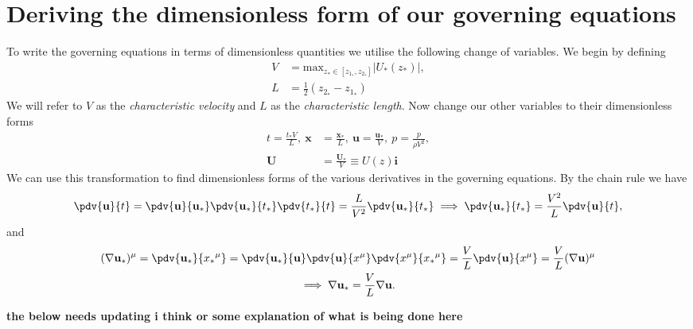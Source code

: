 \section{Deriving the dimensionless form of our governing equations}
To write the governing equations in terms of dimensionless quantities we utilise the following change of variables. We begin by defining
\begin{align}
    V &= \text{max}_{z_* \in [z_{1_*}, z_{2_*}]} |U_* (z_*)|, \nonumber\\
    L &= \frac{1}{2}(z_{2_*} - z_{1_*})
\end{align}
We will refer to $ V $ as the \emph{characteristic velocity} and $ L $ as the \emph{characteristic length}. Now change our other variables to their dimensionless forms
\begin{align}
    t = \frac{t_* V}{L},\ \mathbf{x} &= \frac{\mathbf{x_*}}{L},\ \mathbf{u} = \frac{\mathbf{u_*}}{V},\ p = \frac{p}{\rho V^2}, \nonumber\\ \mathbf{U} &= \frac{\mathbf{U_*}}{V} \equiv U(z) \mathbf{i} 
\end{align}
We can use this transformation to find dimensionless forms of the various derivatives in the governing equations. By the chain rule we have
\begin{equation}
    \pdv{\mathbf{u}}{t} = \pdv{\mathbf{u}}{\mathbf{u_*}} \pdv{\mathbf{u_*}}{t_*} \pdv{t_*}{t} = \frac{L}{V^2} \pdv{\mathbf{u_*}}{t_*} \implies \pdv{\mathbf{u_*}}{t_*} = \frac{V^2}{L} \pdv{\mathbf{u}}{t},
\label{dut*}
\end{equation}
and
\begin{gather}
    (\nabla \mathbf{u_*})^\mu = \pdv{\mathbf{u_*}}{{x_*}^\mu} = \pdv{\mathbf{u_*}}{\mathbf{u}} \pdv{\mathbf{u}}{x^\mu} \pdv{x^\mu}{{x_*}^\mu} = \frac{V}{L} \pdv{\mathbf{u}}{x^\mu} = \frac{V}{L} (\nabla \mathbf{u})^\mu \nonumber\\
    \implies \nabla \mathbf{u_*} = \frac{V}{L} \nabla \mathbf{u}.
\label{gradu*}
\end{gather}

\textbf{the below needs updating i think or some explanation of what is being done here}


